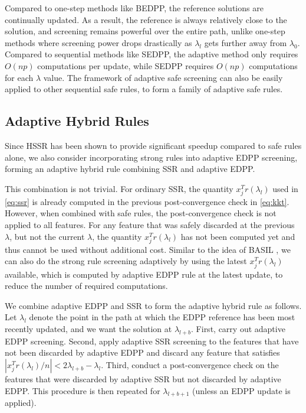 \documentclass[]{interact}
\theoremstyle{plain}%
\theoremstyle{definition}
\theoremstyle{remark}
\begin{document}
Compared to one-step methods like BEDPP, the reference solutions are continually updated.  As a result, the reference is always relatively close to the solution, and screening remains powerful over the entire path, unlike one-step methods where screening power drops drastically as $\lambda_l$ gets further away from $\lambda_0$. Compared to sequential methods like SEDPP, the adaptive method only requires $O(np)$ computations per update, while SEDPP requires $O(np)$ computations for each $\lambda$ value. The framework of adaptive safe screening can also be easily applied to other sequential safe rules, to form a family of adaptive safe rules.

\subsection{Adaptive Hybrid Rules}

Since HSSR \citep{Zeng2021} has been shown to provide significant speedup compared to safe rules alone, we also consider incorporating strong rules into adaptive EDPP screening, forming an adaptive hybrid rule combining SSR and adaptive EDPP.

This combination is not trivial. For ordinary SSR, the quantity $x_j^Tr(\lambda_l)$ used in \eqref{eq:ssr} is already computed in the previous post-convergence check in \eqref{eq:kkt}. However, when combined with safe rules, the post-convergence check is not applied to all features. For any feature that was safely discarded at the previous $\lambda$, but not the current $\lambda$, the quantity $x_j^Tr(\lambda_l)$ has not been computed yet and thus cannot be used without additional cost. Similar to the idea of BASIL \citep{qian2019fast}, we can also do the strong rule screening adaptively by using the latest $x_j^Tr(\lambda_l)$ available, which is computed by adaptive EDPP rule at the latest update, to reduce the number of required computations.

We combine adaptive EDPP and SSR to form the adaptive hybrid rule as follows. Let $\lambda_l$ denote the point in the path at which the EDPP reference has been most recently updated, and we want the solution at $\lambda_{l+b}$. First, carry out adaptive EDPP screening. Second, apply adaptive SSR screening to the features that have not been discarded by adaptive EDPP and discard any feature that satisfies $|x_j^Tr(\lambda_l)/n|<2\lambda_{l+b}-\lambda_l$. Third, conduct a post-convergence check on the features that were discarded by adaptive SSR but not discarded by adaptive EDPP. This procedure is then repeated for $\lambda_{l+b+1}$ (unless an EDPP update is applied).
\end{document}

